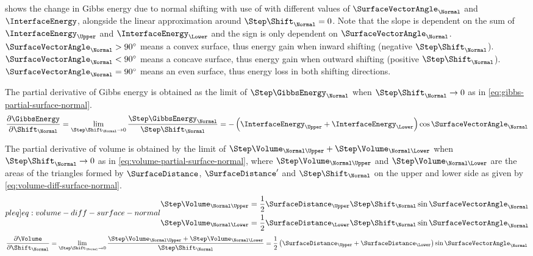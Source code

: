  shows the change in Gibbs energy due to normal shifting with use of  with different values of $\SurfaceVectorAngle_{\Normal}$ and $\InterfaceEnergy$, alongside the linear approximation around ${\Step\Shift}_{\Normal} = 0$.
Note that the slope is dependent on the sum of ${\InterfaceEnergy}_{\Upper}$ and ${\InterfaceEnergy}_{\Lower}$ and the sign is only dependent on $\SurfaceVectorAngle_{\Normal}$.
$\SurfaceVectorAngle_{\Normal} > \qty{90}{\degree}$ means a convex surface, thus energy gain when inward shifting (negative ${\Step\Shift}_{\Normal}$).
$\SurfaceVectorAngle_{\Normal} < \qty{90}{\degree}$ means a concave surface, thus energy gain when outward shifting (positive ${\Step\Shift}_{\Normal}$).
$\SurfaceVectorAngle_{\Normal} = \qty{90}{\degree}$ means an even surface, thus energy loss in both shifting directions.

The partial derivative of Gibbs energy is obtained as the limit of $\Step\GibbsEnergy_{\Normal}$ when ${\Step\Shift}_{\Normal} \rightarrow 0$ as in \cref{eq:gibbs-partial-surface-normal}.
\begin{equation}
    \frac{\partial \GibbsEnergy}{\partial {\Shift}_{\Normal}} = \lim_{\Step\Shift_{\Normal} \rightarrow 0} \frac{\Step\GibbsEnergy_{\Normal}}{\Step\Shift_{\Normal}} = -\left({\InterfaceEnergy}_{\Upper} + {\InterfaceEnergy}_{\Lower}\right) \cos \SurfaceVectorAngle_{\Normal}
    \label{eq:gibbs-partial-surface-normal}
\end{equation}

The partial derivative of volume is obtained by the limit of $\Step\Volume_{\Normal\Upper} + \Step\Volume_{\Normal\Lower}$ when ${\Step\Shift}_{\Normal} \rightarrow 0$ as in \cref{eq:volume-partial-surface-normal}, where $\Step\Volume_{\Normal\Upper}$ and $\Step\Volume_{\Normal\Lower}$ are the areas of the triangles formed by $\SurfaceDistance$, $\SurfaceDistance'$ and $\Step\Shift_{\Normal}$ on the upper and lower side as given by \cref{eq:volume-diff-surface-normal}.
\begin{subequations}
    \label[pleq]{eq:volume-diff-surface-normal}
    \begin{align}
        \Step\Volume_{\Normal\Upper} &= \frac12 \SurfaceDistance_{\Upper} \Step\Shift_{\Normal} \sin \SurfaceVectorAngle_{\Normal} \\
        \Step\Volume_{\Normal\Lower} &= \frac12 \SurfaceDistance_{\Lower} \Step\Shift_{\Normal} \sin \SurfaceVectorAngle_{\Normal}
    \end{align}
\end{subequations}
\begin{equation}
    \frac{\partial \Volume}{\partial {\Shift}_{\Normal}} = \lim_{\Step\Shift_{\Normal} \rightarrow 0} \frac{\Step\Volume_{\Normal\Upper} + \Step\Volume_{\Normal\Lower}}{\Step\Shift_{\Normal}} = \frac{1}{2} \left( \SurfaceDistance_{\Upper} + \SurfaceDistance_{\Lower} \right) \sin \SurfaceVectorAngle_{\Normal}
    \label{eq:volume-partial-surface-normal}
\end{equation}

